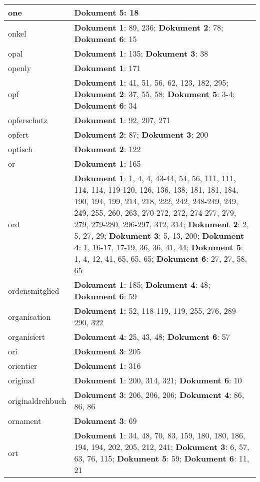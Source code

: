 \documentclass[a5paper]{article}
\begin{document}
\begin{longtable}[l]{|l|p{3in}|}
\hline
one & \textbf{Dokument 5}: 18 \\
\hline
onkel & \textbf{Dokument 1}: 89, 236; \textbf{Dokument 2}: 78; \textbf{Dokument 6}: 15 \\
\hline
opal & \textbf{Dokument 1}: 135; \textbf{Dokument 3}: 38 \\
\hline
openly & \textbf{Dokument 1}: 171 \\
\hline
opf & \textbf{Dokument 1}: 41, 51, 56, 62, 123, 182, 295; \textbf{Dokument 2}: 37, 55, 58; \textbf{Dokument 5}: 3-4; \textbf{Dokument 6}: 34 \\
\hline
opferschutz & \textbf{Dokument 1}: 92, 207, 271 \\
\hline
opfert & \textbf{Dokument 2}: 87; \textbf{Dokument 3}: 200 \\
\hline
optisch & \textbf{Dokument 2}: 122 \\
\hline
or & \textbf{Dokument 1}: 165 \\
\hline
ord & \textbf{Dokument 1}: 1, 4, 4, 43-44, 54, 56, 111, 111, 114, 114, 119-120, 126, 136, 138, 181, 181, 184, 190, 194, 199, 214, 218, 222, 242, 248-249, 249, 249, 255, 260, 263, 270-272, 272, 274-277, 279, 279, 279-280, 296-297, 312, 314; \textbf{Dokument 2}: 2, 5, 27, 29; \textbf{Dokument 3}: 5, 13, 200; \textbf{Dokument 4}: 1, 16-17, 17-19, 36, 36, 41, 44; \textbf{Dokument 5}: 1, 4, 12, 41, 65, 65, 65; \textbf{Dokument 6}: 27, 27, 58, 65 \\
\hline
ordensmitglied & \textbf{Dokument 1}: 185; \textbf{Dokument 4}: 48; \textbf{Dokument 6}: 59 \\
\hline
organisation & \textbf{Dokument 1}: 52, 118-119, 119, 255, 276, 289-290, 322 \\
\hline
organisiert & \textbf{Dokument 4}: 25, 43, 48; \textbf{Dokument 6}: 57 \\
\hline
ori & \textbf{Dokument 3}: 205 \\
\hline
orientier & \textbf{Dokument 1}: 316 \\
\hline
original & \textbf{Dokument 1}: 200, 314, 321; \textbf{Dokument 6}: 10 \\
\hline
originaldrehbuch & \textbf{Dokument 3}: 206, 206, 206; \textbf{Dokument 4}: 86, 86, 86 \\
\hline
ornament & \textbf{Dokument 3}: 69 \\
\hline
ort & \textbf{Dokument 1}: 34, 48, 70, 83, 159, 180, 180, 186, 194, 194, 202, 205, 212, 241; \textbf{Dokument 3}: 6, 57, 63, 76, 115; \textbf{Dokument 5}: 59; \textbf{Dokument 6}: 11, 21 \\

\end{longtable}
\end{document}
